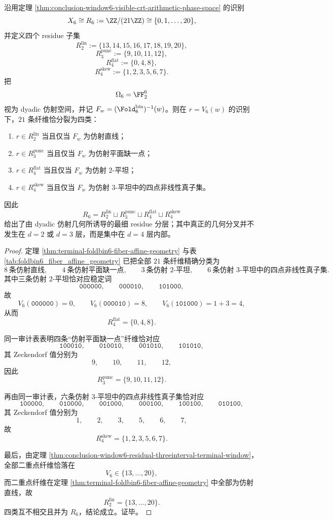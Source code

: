 \begin{theorem}\label{thm:conclusion-window6-affine-fiber-arithmetic-support}
沿用定理 \ref{thm:conclusion-window6-visible-crt-arithmetic-phase-space} 的识别
\[
X_6\cong R_6:=\ZZ/(21\ZZ)\cong \{0,1,\dots,20\},
\]
并定义四个 residue 子集
\[
R_{2}^{\mathrm{lin}}:=\{13,14,15,16,17,18,19,20\},
\]
\[
R_{3}^{\mathrm{punc}}:=\{9,10,11,12\},
\]
\[
R_{4}^{\mathrm{flat}}:=\{0,4,8\},
\]
\[
R_{4}^{\mathrm{skew}}:=\{1,2,3,5,6,7\}.
\]
把
\[
\Omega_6=\FF_2^6
\]
视为 dyadic 仿射空间，并记 \(F_w=(\Fold_6^{\mathrm{bin}})^{-1}(w)\)。则在 \(r=V_6(w)\) 的识别下，\(21\) 条纤维恰分裂为四类：
\begin{enumerate}
  \item \(r\in R_{2}^{\mathrm{lin}}\) 当且仅当 \(F_w\) 为仿射直线；
  \item \(r\in R_{3}^{\mathrm{punc}}\) 当且仅当 \(F_w\) 为仿射平面缺一点；
  \item \(r\in R_{4}^{\mathrm{flat}}\) 当且仅当 \(F_w\) 为仿射 \(2\)-平坦；
  \item \(r\in R_{4}^{\mathrm{skew}}\) 当且仅当 \(F_w\) 为仿射 \(3\)-平坦中的四点非线性真子集。
\end{enumerate}
因此
\[
R_6
=
R_{2}^{\mathrm{lin}}
\sqcup
R_{3}^{\mathrm{punc}}
\sqcup
R_{4}^{\mathrm{flat}}
\sqcup
R_{4}^{\mathrm{skew}}
\]
给出了由 dyadic 仿射几何所诱导的最细 residue 分层；其中真正的几何分叉并不发生在 \(d=2\) 或 \(d=3\) 层，而是集中在 \(d=4\) 层内部。
\end{theorem}
\begin{proof}
定理 \ref{thm:terminal-foldbin6-fiber-affine-geometry} 与表 \ref{tab:foldbin6_fiber_affine_geometry} 已把全部 \(21\) 条纤维精确分类为
\[
8\ \text{条仿射直线},\qquad
4\ \text{条仿射平面缺一点},\qquad
3\ \text{条仿射 }2\text{-平坦},\qquad
6\ \text{条仿射 }3\text{-平坦中的四点非线性真子集}.
\]
其中三条仿射 \(2\)-平坦恰对应稳定词
\[
\texttt{000000},\qquad \texttt{000010},\qquad \texttt{101000},
\]
故
\[
V_6(\texttt{000000})=0,\qquad
V_6(\texttt{000010})=8,\qquad
V_6(\texttt{101000})=1+3=4,
\]
从而
\[
R_{4}^{\mathrm{flat}}=\{0,4,8\}.
\]

同一审计表表明四条“仿射平面缺一点”纤维恰对应
\[
\texttt{100010},\qquad
\texttt{010010},\qquad
\texttt{001010},\qquad
\texttt{101010},
\]
其 Zeckendorf 值分别为
\[
9,\qquad 10,\qquad 11,\qquad 12,
\]
因此
\[
R_{3}^{\mathrm{punc}}=\{9,10,11,12\}.
\]

再由同一审计表，六条仿射 \(3\)-平坦中的四点非线性真子集恰对应
\[
\texttt{100000},\qquad
\texttt{010000},\qquad
\texttt{001000},\qquad
\texttt{000100},\qquad
\texttt{100100},\qquad
\texttt{010100},
\]
其 Zeckendorf 值分别为
\[
1,\qquad 2,\qquad 3,\qquad 5,\qquad 6,\qquad 7,
\]
故
\[
R_{4}^{\mathrm{skew}}=\{1,2,3,5,6,7\}.
\]

最后，由定理 \ref{thm:conclusion-window6-residual-threeinterval-terminal-window}，全部二重点纤维恰落在
\[
V_6\in\{13,\dots,20\},
\]
而二重点纤维在定理 \ref{thm:terminal-foldbin6-fiber-affine-geometry} 中全部为仿射直线，故
\[
R_{2}^{\mathrm{lin}}=\{13,\dots,20\}.
\]
四类互不相交且并为 \(R_6\)，结论成立。证毕。
\end{proof}

